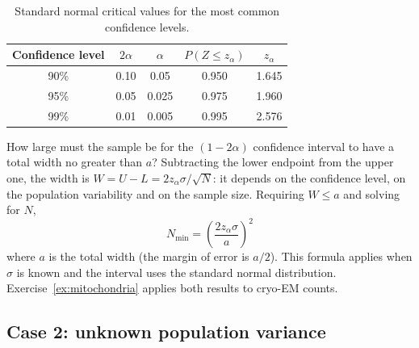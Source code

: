 \documentclass[letterpaper,11pt,leqno]{book}
\begin{document}
\begin{table}[!htbp]
\centering
\caption{Standard normal critical values for the most common confidence levels.}
\label{tab:z_values}
\begin{tabular*}{\textwidth}{c@{\extracolsep\fill}cccc}
\toprule
Confidence level & $2\alpha$ & $\alpha$ & $P(Z \le z_\alpha)$ & $z_\alpha$ \\
\midrule
90\% & 0.10 & 0.05 & 0.950 & 1.645 \\
95\% & 0.05 & 0.025 & 0.975 & 1.960 \\
99\% & 0.01 & 0.005 & 0.995 & 2.576 \\
\bottomrule
\end{tabular*}
\end{table}

How large must the sample be for the $(1 - 2\alpha)$ confidence interval to have a total width no greater than $a$? Subtracting the lower endpoint from the upper one, the width is $W = U - L = 2z_\alpha\sigma/\sqrt{N}$: it depends on the confidence level, on the population variability and on the sample size. Requiring $W \le a$ and solving for $N$,
\begin{equation}
\boxed{N_{\min} = \left(\frac{2z_\alpha\sigma}{a}\right)^2}
\label{eq:sample_size}
\end{equation}
where $a$ is the total width (the margin of error is $a/2$). This formula applies when $\sigma$ is known and the interval uses the standard normal distribution. Exercise~\ref{ex:mitochondria} applies both results to cryo-EM counts.

\subsection{Case 2: unknown population variance}
\end{document}
